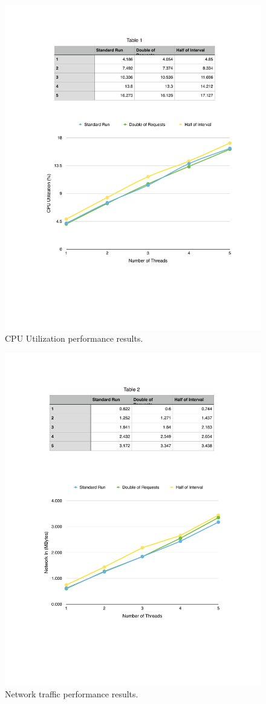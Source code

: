 \begin{figure}[ht!]
  \centering
  \includegraphics[width=.75\textwidth]{./images/cpu_3_lap}
  \caption{CPU Utilization performance results.}
  \label{fig:eval_3laps_cpu}
\end{figure}

\begin{figure}[ht!]
  \centering
  \includegraphics[width=.75\textwidth]{./images/network_3_lap}
  \caption{Network traffic performance results.}
  \label{fig:eval_3laps_network}
\end{figure}

